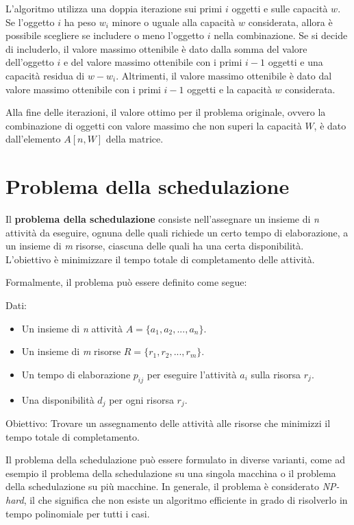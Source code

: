 L'algoritmo utilizza una doppia iterazione sui primi $i$ oggetti e sulle capacità $w$. Se l'oggetto $i$ ha peso $w_i$ minore o uguale alla capacità $w$ considerata, allora è possibile scegliere se includere o meno l'oggetto $i$ nella combinazione. Se si decide di includerlo, il valore massimo ottenibile è dato dalla somma del valore dell'oggetto $i$ e del valore massimo ottenibile con i primi $i-1$ oggetti e una capacità residua di $w-w_i$. Altrimenti, il valore massimo ottenibile è dato dal valore massimo ottenibile con i primi $i-1$ oggetti e la capacità $w$ considerata.

Alla fine delle iterazioni, il valore ottimo per il problema originale, ovvero la combinazione di oggetti con valore massimo che non superi la capacità $W$, è dato dall'elemento $A[n, W]$ della matrice.

\section{Problema della schedulazione}

Il \textbf{problema della schedulazione} consiste nell'assegnare un insieme di \textit{n} attività da eseguire, ognuna delle quali richiede un certo tempo di elaborazione, a un insieme di \textit{m} risorse, ciascuna delle quali ha una certa disponibilità. L'obiettivo è minimizzare il tempo totale di completamento delle attività.

Formalmente, il problema può essere definito come segue:

Dati:
\begin{itemize}
    \item Un insieme di \textit{n} attività $A = \{a_1, a_2, ..., a_n\}$.
    \item Un insieme di \textit{m} risorse $R = \{r_1, r_2, ..., r_m\}$.
    \item Un tempo di elaborazione $p_{ij}$ per eseguire l'attività $a_i$ sulla risorsa $r_j$.
    \item Una disponibilità $d_j$ per ogni risorsa $r_j$.
\end{itemize}
Obiettivo: Trovare un assegnamento delle attività alle risorse che minimizzi il tempo totale di completamento.


Il problema della schedulazione può essere formulato in diverse varianti, come ad esempio il problema della schedulazione su una singola macchina o il problema della schedulazione su più macchine. In generale, il problema è considerato \textit{NP-hard}, il che significa che non esiste un algoritmo efficiente in grado di risolverlo in tempo polinomiale per tutti i casi.
